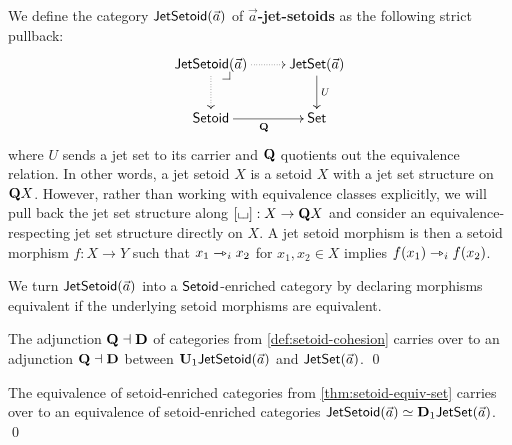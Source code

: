 \documentclass[a4paper]{memoir}
\begin{document}
\begin{definition} \label{def:jetsetoid}
	We define the category $\mathsf{JetSetoid}(\vec a)$ of \textbf{$\vec a$-jet-setoids} as the following strict pullback:
	\[
		\xymatrix{
			\jetsetoid{\vec a}
				\xydrcorner
				\ar@{.>}[r]
				\ar@{.>}[d]
			&
			\jetset{\vec a}
				\ar[d]^U
			\\
			\Setoid
				\ar[r]_\setoidquot
			&
			\Set
		}
	\]
	where $U$ sends a jet set to its carrier and ${\mathbf{Q}}$ quotients out the equivalence relation.
	In other words, a jet setoid $X$ is a setoid $X$ with a jet set structure on ${\mathbf{Q}} X$.
	However, rather than working with equivalence classes explicitly, we will pull back the jet set structure along $[{\llcorner\hspace{-.4ex}\lrcorner}] : X \to {\mathbf{Q}} X$ and consider an equivalence-respecting jet set structure directly on $X$.
	A jet setoid morphism is then a setoid morphism $f : X \to Y$ such that $x_1 \rightarrowtriangle_i x_2$ for $x_1, x_2 \in X$ implies $f(x_1) \rightarrowtriangle_i f(x_2)$.
	
	We turn $\mathsf{JetSetoid}(\vec a)$ into a ${\mathsf{Setoid}}$-enriched category by declaring morphisms equivalent if the underlying setoid morphisms are equivalent.
\end{definition}
\begin{corollary} \label{thm:jetsetoid-cohesion}
	The adjunction ${\mathbf{Q}} \dashv {\mathbf{D}}$ of categories from \cref{def:setoid-cohesion} carries over to an adjunction ${\mathbf{Q}} \dashv {\mathbf{D}}$ between ${\mathbf{U}}_1 \mathsf{JetSetoid}(\vec a)$ and $\mathsf{JetSet}(\vec a)$. \qed
\end{corollary}
\begin{corollary} \label{thm:jetsetoid-equiv-jetset}
	The equivalence of setoid-enriched categories from \cref{thm:setoid-equiv-set} carries over to an equivalence of setoid-enriched categories $\mathsf{JetSetoid}(\vec a) \simeq {\mathbf{D}}_1 \mathsf{JetSet}(\vec a)$. \qed
\end{corollary}
\end{document}
